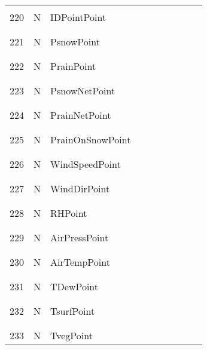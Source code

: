 \begin{longtable}{|c|c|l|c|c|c|c|p{}|c|p{}|}
&&&&&&&&&\\
220 & N & IDPointPoint & & & & & & & \\
&&&&&&&&&\\\hline%
&&&&&&&&&\\
221 & N & PsnowPoint & & & & & & & \\
&&&&&&&&&\\\hline%
&&&&&&&&&\\
222 & N & PrainPoint & & & & & & & \\
&&&&&&&&&\\\hline%
&&&&&&&&&\\
223 & N & PsnowNetPoint & & & & & & & \\
&&&&&&&&&\\\hline%
&&&&&&&&&\\
224 & N & PrainNetPoint & & & & & & & \\
&&&&&&&&&\\\hline%
&&&&&&&&&\\
225 & N & PrainOnSnowPoint & & & & & & & \\
&&&&&&&&&\\\hline%
&&&&&&&&&\\
226 & N & WindSpeedPoint & & & & & & & \\
&&&&&&&&&\\\hline%
&&&&&&&&&\\
227 & N & WindDirPoint & & & & & & & \\
&&&&&&&&&\\\hline%
&&&&&&&&&\\
228 & N & RHPoint & & & & & & & \\
&&&&&&&&&\\\hline%
&&&&&&&&&\\
229 & N & AirPressPoint & & & & & & & \\
&&&&&&&&&\\\hline%
&&&&&&&&&\\
230 & N & AirTempPoint & & & & & & & \\
&&&&&&&&&\\\hline%
&&&&&&&&&\\
231 & N & TDewPoint & & & & & & & \\
&&&&&&&&&\\\hline%
&&&&&&&&&\\
232 & N & TsurfPoint & & & & & & & \\
&&&&&&&&&\\\hline%
&&&&&&&&&\\
233 & N & TvegPoint & & & & & & & \\

\end{longtable}
